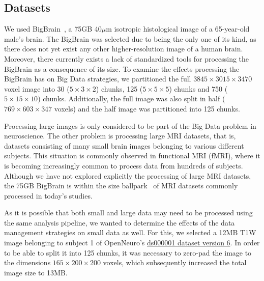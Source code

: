 \documentclass{IEEEtran}
\begin{document}



\subsection{Datasets} %

We used BigBrain~\cite{amunts2013bigbrain}, a 75GB 40$\mu$m isotropic 
histological image of a 65-year-old male's brain. The BigBrain was selected due 
to being the only one of its kind, as there does not yet exist any other
higher-resolution image of a human brain. Moreover, there currently exists a 
lack of standardized tools for processing the BigBrain as a consequence 
of its size. To examine the effects processing the BigBrain has on Big Data 
strategies, we partitioned the full $3845\times3015\times3470$ voxel image into 30 ($5\times3\times2$)
chunks, 125 ($5\times5\times5$) chunks and 750 ($5\times15\times10$) chunks. Additionally, the full 
image was also split in half ($769\times603\times347$ voxels) and the half image was 
partitioned into 125 chunks.

Processing large images is only considered to be part of the Big Data problem 
in neuroscience. The other problem is processing large MRI datasets, 
that is, datasets consisting of many small brain images belonging to 
various different subjects. This situation is commonly observed in 
functional MRI (fMRI), where it is becoming increasingly common to 
process data from hundreds of subjects. Although we have not explored 
explicitly the processing of large MRI datasets, the 75GB BigBrain is 
within the size ballpark~\cite{van2014human} of 
MRI datasets commonly processed in today's studies.

As it is possible that both small and large data may need to be processed using
the same analysis pipeline, we 
wanted to determine the effects of the data management strategies on small 
data as well. For this, we selected a 12MB T1W image belonging to 
subject 1 of OpenNeuro's 
\href{https://openneuro.org/datasets/ds000001/versions/00006/file-display/sub-01:anat:sub-01_T1w.nii.gz}{ds000001 
dataset version 6}. In order to be able to split it into 125 chunks, it 
was necessary to zero-pad the image to the dimensions
$165\times200\times200$ voxels, which subsequently increased the total image size to 13MB.
\end{document}
